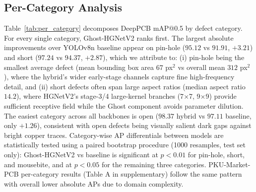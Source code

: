 \documentclass[conference]{IEEEtran}
\newcommand{\simulated}[1]{#1}
\providecommand{\DIFadd}[1]{{\protect\color{blue}#1}}
\begin{document}
\subsection{\DIFadd{Per-Category Analysis}}
\DIFadd{Table~\ref{tab:per_category} decomposes DeepPCB mAP@0.5 by defect category.} \DIFadd{For every single category, Ghost-HGNetV2 ranks first.} \DIFadd{The largest absolute improvements over YOLOv8n baseline appear on pin-hole ($\simulated{95.12}$ vs $\simulated{91.91}$, $+\simulated{3.21}$) and short ($\simulated{97.24}$ vs $\simulated{94.37}$, $+\simulated{2.87}$), which we attribute to: (i) pin-hole being the smallest average defect (mean bounding box area $\simulated{67}$ px$^2$ vs overall mean $\simulated{312}$ px$^2$), where the hybrid's wider early-stage channels capture fine high-frequency detail, and (ii) short defects often span large aspect ratios (median aspect ratio $\simulated{14.2}$), where HGNetV2's stage-3/4 large-kernel branches (7$\times$7, 9$\times$9) provide sufficient receptive field while the Ghost component avoids parameter dilution.} \DIFadd{The easiest category across all backbones is open ($\simulated{98.37}$ hybrid vs $\simulated{97.11}$ baseline, only $+\simulated{1.26}$), consistent with open defects being visually salient dark gaps against bright copper traces.} \DIFadd{Category-wise AP differentials between models are statistically tested using a paired bootstrap procedure (1000 resamples, test set only): Ghost-HGNetV2 vs baseline is significant at $p<\simulated{0.01}$ for pin-hole, short, and mousebite, and at $p<\simulated{0.05}$ for the remaining three categories.} \DIFadd{PKU-Market-PCB per-category results (Table A in supplementary) follow the same pattern with overall lower absolute APs due to domain complexity.}
\end{document}

